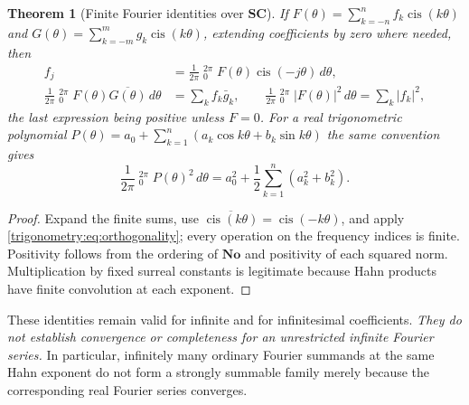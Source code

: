 \documentclass[11pt,letterpaper]{article}
\numberwithin{equation}{section}
\newtheorem{theorem}{Theorem}[section]
\theoremstyle{definition}
\theoremstyle{remark}
\newcommand{\No}{\mathbf{No}}
\newcommand{\SC}{\mathbf{SC}}
\newcommand{\cis}{\operatorname{cis}}
\newcommand{\HInt}{\mathop{\overset{\scriptscriptstyle H}{\int}}\nolimits}
\begin{document}
\begin{theorem}[Finite Fourier identities over $\SC$]\label{trigonometry:thm:parseval}
If $F(\theta)=\sum_{k=-n}^nf_k\cis(k\theta)$ and $G(\theta)=\sum_{k=-m}^mg_k\cis(k\theta)$,
extending coefficients by zero where needed, then
\begin{align}
 f_j&=\frac1{2\pi}\HInt_0^{2\pi}F(\theta)\cis(-j\theta)\,d\theta,\\
 \frac1{2\pi}\HInt_0^{2\pi}F(\theta)\overline{G(\theta)}\,d\theta&=\sum_kf_k\bar g_k,
 \qquad
 \frac1{2\pi}\HInt_0^{2\pi}|F(\theta)|^2\,d\theta=\sum_k|f_k|^2,
 \label{trigonometry:eq:parseval}
\end{align}
the last expression being positive unless $F=0$. For a real trigonometric polynomial
$P(\theta)=a_0+\sum_{k=1}^n(a_k\cos k\theta+b_k\sin k\theta)$ the same convention gives
\begin{equation}\label{trigonometry:eq:continuousparseval}
 \frac1{2\pi}\HInt_0^{2\pi}P(\theta)^2\,d\theta=a_0^2+\frac12\sum_{k=1}^n(a_k^2+b_k^2).
\end{equation}
\end{theorem}
\begin{proof}
Expand the finite sums, use $\overline{\cis(k\theta)}=\cis(-k\theta)$, and apply
\cref{trigonometry:eq:orthogonality}; every operation on the frequency indices is finite.
Positivity follows from the ordering of $\No$ and positivity of each squared norm. Multiplication
by fixed surreal constants is legitimate because Hahn products have finite convolution at each
exponent.
\end{proof}
These identities remain valid for infinite and for infinitesimal coefficients. \emph{They do not
establish convergence or completeness for an unrestricted infinite Fourier series.} In particular,
infinitely many ordinary Fourier summands at the same Hahn exponent do not form a strongly summable
family merely because the corresponding real Fourier series converges.
\end{document}
